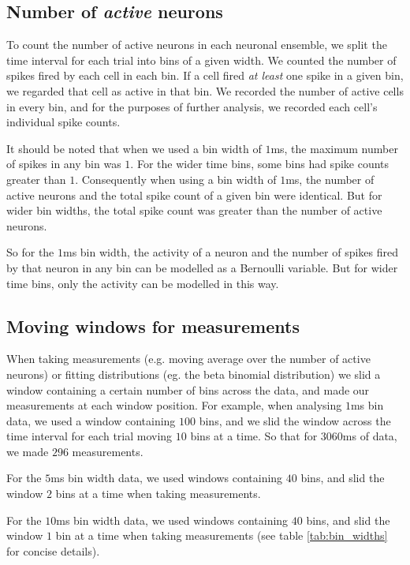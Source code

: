     \subsection{Number of \textit{active} neurons}\label{sec:num_active_neurons}
    To count the number of active neurons in each neuronal ensemble, we split the time interval for each trial into bins of a given width. We counted the number of spikes fired by each cell in each bin. If a cell fired \textit{at least} one spike in a given bin, we regarded that cell as active in that bin. We recorded the number of active cells in every bin, and for the purposes of further analysis, we recorded each cell's individual spike counts.

    It should be noted that when we used a bin width of $1$ms, the maximum number of spikes in any bin was $1$. For the wider time bins, some bins had spike counts greater than $1$. Consequently when using a bin width of $1$ms, the number of active neurons and the total spike count of a given bin were identical. But for wider bin widths, the total spike count was greater than the number of active neurons.

    So for the $1$ms bin width, the activity of a neuron and the number of spikes fired by that neuron in any bin can be modelled as a Bernoulli variable. But for wider time bins, only the activity can be modelled in this way.

    \subsection{Moving windows for measurements}\label{sec:measurements}

    When taking measurements (e.g. moving average over the number of active neurons) or fitting distributions (eg. the beta binomial distribution) we slid a window containing a certain number of bins across the data, and made our measurements at each window position. For example, when analysing $1$ms bin data, we used a window containing $100$ bins, and we slid the window across the time interval for each trial moving $10$ bins at a time. So that for $3060$ms of data, we made $296$ measurements.

    For the $5$ms bin width data, we used windows containing $40$ bins, and slid the window $2$ bins at a time when taking measurements.

    For the $10$ms bin width data, we used windows containing $40$ bins, and slid the window $1$ bin at a time when taking measurements (see table \ref{tab:bin_widths} for concise details).

